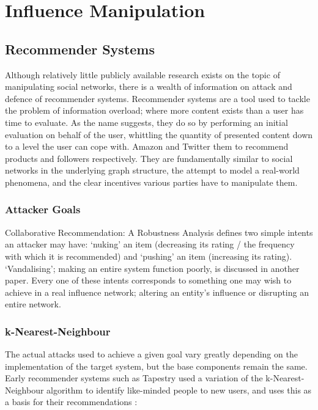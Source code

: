 \section{Influence Manipulation}

\subsection{Recommender Systems}

Although relatively little publicly available research exists on the topic of manipulating social networks, there is a wealth of information on attack and defence of recommender systems. Recommender systems are a tool used to tackle the problem of information overload; where more content exists than a user has time to evaluate. As the name suggests, they do so by performing an initial evaluation on behalf of the user, whittling the quantity of presented content down to a level the user can cope with. Amazon and Twitter them to recommend products and followers respectively. They are fundamentally similar to social networks in the underlying graph structure, the attempt to model a real-world phenomena, and the clear incentives various parties have to manipulate them.

\subsubsection{Attacker Goals}

Collaborative Recommendation: A Robustness Analysis \cite{originalAttack} defines two simple intents an attacker may have: `nuking' an item (decreasing its rating / the frequency with which it is recommended) and `pushing' an item (increasing its rating). `Vandalising'; making an entire system function poorly, is discussed in another paper. Every one of these intents corresponds to something one may wish to achieve in a real influence network; altering an entity's influence or disrupting an entire network.

\subsubsection{k-Nearest-Neighbour}

The actual attacks used to achieve a given goal vary greatly depending on the implementation of the target system, but the base components remain the same. Early recommender systems such as Tapestry used a variation of the k-Nearest-Neighbour algorithm to identify like-minded people to new users, and uses this as a basis for their recommendations \cite{funProfit}:  

